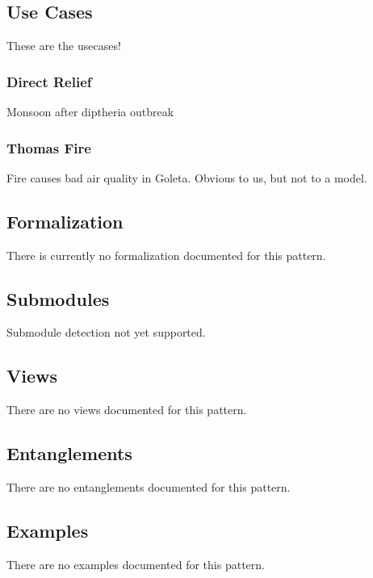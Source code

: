 \subsection{Use Cases}
\label{ssec:use-cases}
These are the usecases!

\subsubsection{Direct Relief}
Monsoon after diptheria outbreak

\subsubsection{Thomas Fire}
Fire causes bad air quality in Goleta. Obvious to us, but not to a model.

\subsection{Formalization}
\label{ssec:formalization}
There is currently no formalization documented for this pattern.

\subsection{Submodules}
\label{ssec:submodules}
Submodule detection not yet supported.

\subsection{Views}
\label{ssec:views}
There are no views documented for this pattern.


\subsection{Entanglements}
\label{ssec:entanglements}
There are no entanglements documented for this pattern.

\subsection{Examples}
\label{ssec:examples}
There are no examples documented for this pattern.

